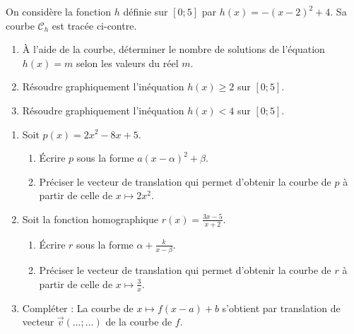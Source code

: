\documentclass[11pt]{article}
\begin{document}
\begin{exercice}
On considère la fonction $h$ définie sur $[0 ; 5]$ par $h(x) = -(x-2)^2 + 4$. Sa courbe $\mathcal{C}_h$ est tracée ci-contre.
\begin{center}
\end{center}
\begin{enumerate}
    \item À l'aide de la courbe, déterminer le nombre de solutions de l'équation $h(x) = m$ selon les valeurs du réel $m$.
    \item Résoudre graphiquement l'inéquation $h(x) \geq 2$ sur $[0 ; 5]$.
    \item Résoudre graphiquement l'inéquation $h(x) < 4$ sur $[0 ; 5]$.
\end{enumerate}
\end{exercice}

\begin{exercice}
\begin{enumerate}
    \item Soit $p(x) = 2x^2 - 8x + 5$. 
    \begin{enumerate}
        \item Écrire $p$ sous la forme $a(x-\alpha)^2 + \beta$.
        \item Préciser le vecteur de translation qui permet d'obtenir la courbe de $p$ à partir de celle de $x \mapsto 2x^2$.
    \end{enumerate}
    \item Soit la fonction homographique $r(x) = \frac{3x-5}{x+2}$.
    \begin{enumerate}
        \item Écrire $r$ sous la forme $\alpha + \frac{k}{x-\beta}$.
        \item Préciser le vecteur de translation qui permet d'obtenir la courbe de $r$ à partir de celle de $x \mapsto \frac{3}{x}$.
    \end{enumerate}
    \item Compléter : La courbe de $x \mapsto f(x-a)+b$ s'obtient par translation de vecteur $\overrightarrow{v}\left(\ldots ; \ldots\right)$ de la courbe de $f$.
\end{enumerate}
\end{exercice}
\end{document}
